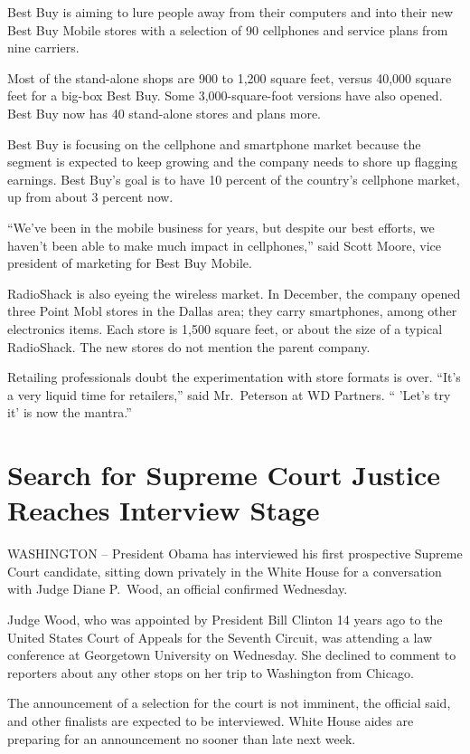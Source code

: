 \documentclass[12pt,a4paper,onecolumn]{article}
\begin{document}
Best Buy is aiming to lure people away from their computers and into their new Best Buy Mobile
stores with a selection of 90 cellphones and service plans from nine carriers.

Most of the stand-alone shops are 900 to 1,200 square feet, versus 40,000 square feet for a big-box
Best Buy. Some 3,000-square-foot versions have also opened. Best Buy now has 40 stand-alone stores
and plans more.

Best Buy is focusing on the cellphone and smartphone market because the segment is expected to keep
growing and the company needs to shore up flagging earnings. Best Buy's goal is to have 10 percent
of the country's cellphone market, up from about 3 percent now.

``We've been in the mobile business for years, but despite our best efforts, we haven't been able to
make much impact in cellphones,'' said Scott Moore, vice president of marketing for Best Buy Mobile.

RadioShack is also eyeing the wireless market. In December, the company opened three Point Mobl
stores in the Dallas area; they carry smartphones, among other electronics items. Each store is
1,500 square feet, or about the size of a typical RadioShack. The new stores do not mention the
parent company.

Retailing professionals doubt the experimentation with store formats is over. ``It's a very liquid
time for retailers,'' said Mr.~Peterson at WD Partners. `` 'Let's try it' is now the mantra.''

\section{Search for Supreme Court Justice Reaches Interview Stage}

WASHINGTON -- President Obama has interviewed his first prospective Supreme Court candidate, sitting
down privately in the White House for a conversation with Judge Diane P.~Wood, an official confirmed
Wednesday.

Judge Wood, who was appointed by President Bill Clinton 14 years ago to the United States Court of
Appeals for the Seventh Circuit, was attending a law conference at Georgetown University on
Wednesday. She declined to comment to reporters about any other stops on her trip to Washington from
Chicago.

The announcement of a selection for the court is not imminent, the official said, and other
finalists are expected to be interviewed. White House aides are preparing for an announcement no
sooner than late next week.
\end{document}
